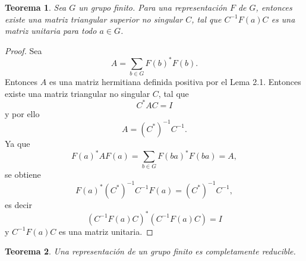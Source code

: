 \documentclass[12pt]{book}
\newtheorem{theorem}{Teorema}[section]
\theoremstyle{definition}
\newcounter{in}
\newcounter{ini}
\begin{document}
\begin{theorem}
  \label{t2_3}
  Sea $G$ un grupo finito. Para una representación $F$ de $G$,
  entonces existe una matriz triangular superior no singular $C$,
  tal que $C^{-1}F\left(a\right)C$ es una matriz unitaria para todo
  $a \in G$.
\end{theorem}

\begin{proof}
  Sea
  \begin{equation*}
    A=\sum_{b \in G} F \left(b\right)^{*}F\left(b\right).
  \end{equation*}
  Entonces $A$ es una matriz hermitiana definida positiva por el Lema
  2.1. Entonces existe una matriz triangular no singular $C$, tal que
  \begin{equation*}
    C^{*}AC= I
  \end{equation*}
  y por ello
  \begin{equation}
    \label{eq:9}
    A=(C^{*})^{-1}C^{-1}.
  \end{equation}
  Ya que
  \begin{equation}
    \label{eq:10}
    F\left(a\right)^{*} AF\left(a\right)=\sum_{b \in G} F\left(ba\right)^{*} F\left(ba\right)=A,
  \end{equation}
  se obtiene
  \begin{equation}
    \label{eq:11}
    F\left(a\right)^{*}(C^{*})^{-1}C^{-1}F\left(a\right)=(C^{*})^{-1}C^{-1},
  \end{equation}
  es decir
  \begin{equation}
    \label{eq:12}
    (C^{-1}F(a)C)^{*}(C^{-1}F(a)C)=I
  \end{equation}
  y $C^{-1}F(a)C$ es una matriz unitaria.
\end{proof}
\begin{theorem}
  \label{t2_4}
  Una representación de un grupo finito es
  completamente reducible.
\end{theorem}
\end{document}
